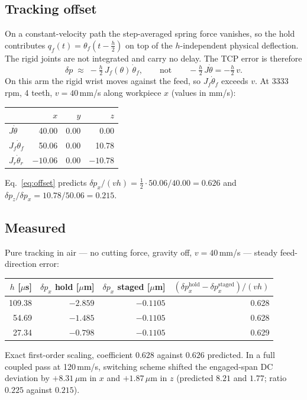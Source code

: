 \documentclass[11pt]{article}
\begin{document}
\subsection{Tracking offset}\label{sec:offset}

On a constant-velocity path the step-averaged spring force vanishes, so the hold contributes
$q_f(t)=\theta_f(t-\tfrac h2)$ on top of the $h$-independent physical deflection. The rigid joints
are not integrated and carry no delay. The TCP error is therefore
\begin{equation}
  \delta p\;\approx\;-\tfrac h2\,J_f(\theta)\,\dot\theta_f,
  \qquad\text{not}\qquad -\tfrac h2\,J\dot\theta=-\tfrac h2\,v .
  \label{eq:offset}
\end{equation}
On this arm the rigid wrist moves against the feed, so $J_f\dot\theta_f$ exceeds $v$.
At 3333\,rpm, 4 teeth, $v=40$\,mm/s along workpiece $x$ (values in mm/s):
\begin{center}
\begin{tabular}{lrrr}
\toprule
 & $x$ & $y$ & $z$ \\
\midrule
$J\dot\theta$            & 40.00 & 0.00 & 0.00 \\
$J_f\dot\theta_f$        & 50.06 & 0.00 & 10.78 \\
$J_r\dot\theta_r$        & $-10.06$ & 0.00 & $-10.78$ \\
\bottomrule
\end{tabular}
\end{center}
Eq.~\eqref{eq:offset} predicts $\delta p_x/(vh)=\tfrac12\cdot50.06/40.00=0.626$ and
$\delta p_z/\delta p_x=10.78/50.06=0.215$.

\subsection{Measured}

Pure tracking in air --- no cutting force, gravity off, $v=40$\,mm/s --- steady feed-direction
error:
\begin{center}
\begin{tabular}{rrrr}
\toprule
$h$ [$\mu$s] & $\delta p_x$ hold [$\mu$m] & $\delta p_x$ staged [$\mu$m] &
$(\delta p_x^{\mathrm{hold}}-\delta p_x^{\mathrm{staged}})/(vh)$ \\
\midrule
109.38 & $-2.859$ & $-0.1105$ & 0.628 \\
 54.69 & $-1.485$ & $-0.1105$ & 0.628 \\
 27.34 & $-0.798$ & $-0.1105$ & 0.629 \\
\bottomrule
\end{tabular}
\end{center}
Exact first-order scaling, coefficient $0.628$ against $0.626$ predicted. In a full coupled pass
at 120\,mm/s, switching scheme shifted the engaged-span DC deviation by $+8.31\,\mu$m in $x$ and
$+1.87\,\mu$m in $z$ (predicted $8.21$ and $1.77$; ratio $0.225$ against $0.215$).
\end{document}
